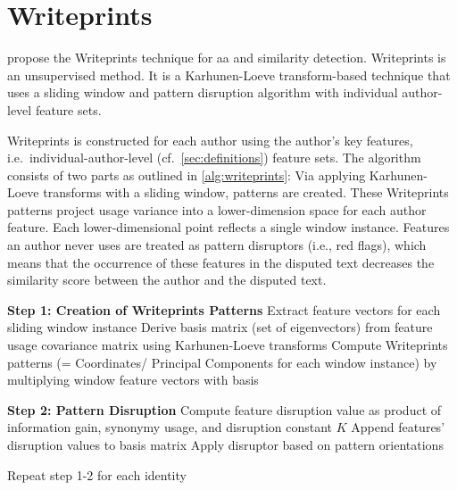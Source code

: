 \newcommand{\writeprints}{Writeprints}
\section{\writeprints{}}
\label{sec:writeprints}

\citet{abbasi_writeprints_2008} propose the \writeprints{} technique for \ac{aa} and similarity detection.
\writeprints{} is an unsupervised method. %
It is a Karhunen-Loeve transform-based technique that uses a sliding window and 
pattern disruption algorithm with individual author-level feature sets.

\writeprints{} is constructed for each author using the author's key features, 
i.e.\ individual-author-level (cf.~\autoref{sec:definitions}) feature sets.
The algorithm consists of two parts as outlined in \autoref{alg:writeprints}:
Via applying Karhunen-Loeve transforms with a sliding window, patterns are created.
These \writeprints{} patterns project usage variance into a lower-dimension space for each author feature.
Each lower-dimensional point reflects a single window instance.
Features an author never uses are treated as pattern disruptors (i.e., red flags), 
which means that the occurrence of these features in the disputed text decreases the similarity score 
between the author and the disputed text.

\begin{algorithm}
\caption{Writeprints Steps}
\label{alg:writeprints}
\begin{algorithmic}[1]

        \State \textbf{Step 1: Creation of \writeprints{} Patterns}
            
            \State Extract feature vectors for each sliding window instance 
            \State Derive basis matrix (set of eigenvectors) from feature usage covariance matrix using Karhunen-Loeve transforms 
            \State Compute \writeprints{} patterns (= Coordinates/ Principal Components for each window instance) by multiplying window feature vectors with basis
        \EndFor
       

        \State \textbf{Step 2: Pattern Disruption}  
         
            \State Compute feature disruption value as product of information gain, synonymy usage, and disruption constant $K$
            \State Append features' disruption values to basis matrix
            \State Apply disruptor based on pattern orientations
          
        \EndFor

        \State Repeat step 1-2 for each identity
    \EndProcedure
\end{algorithmic}
\end{algorithm}



